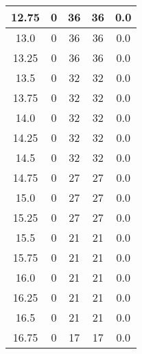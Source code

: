 \documentclass[letterpaper, 12pt]{article}
\begin{document}
\begin{longtable}{|c|c|c|c|c|}
\hline
12.75 & 0 & 36 & 36 & 0.0 \\
\hline
13.0 & 0 & 36 & 36 & 0.0 \\
\hline
13.25 & 0 & 36 & 36 & 0.0 \\
\hline
13.5 & 0 & 32 & 32 & 0.0 \\
\hline
13.75 & 0 & 32 & 32 & 0.0 \\
\hline
14.0 & 0 & 32 & 32 & 0.0 \\
\hline
14.25 & 0 & 32 & 32 & 0.0 \\
\hline
14.5 & 0 & 32 & 32 & 0.0 \\
\hline
14.75 & 0 & 27 & 27 & 0.0 \\
\hline
15.0 & 0 & 27 & 27 & 0.0 \\
\hline
15.25 & 0 & 27 & 27 & 0.0 \\
\hline
15.5 & 0 & 21 & 21 & 0.0 \\
\hline
15.75 & 0 & 21 & 21 & 0.0 \\
\hline
16.0 & 0 & 21 & 21 & 0.0 \\
\hline
16.25 & 0 & 21 & 21 & 0.0 \\
\hline
16.5 & 0 & 21 & 21 & 0.0 \\
\hline
16.75 & 0 & 17 & 17 & 0.0 \\
\hline
\end{longtable}
\end{document}
